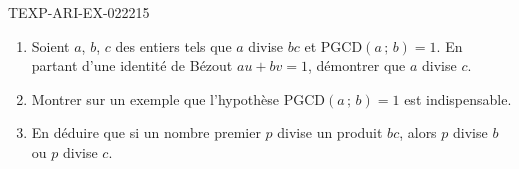 \begin{exercice}{TEXP-ARI-EX-022}{2}{15}
\begin{enumerate}
  \item Soient $a$, $b$, $c$ des entiers tels que $a$ divise $bc$ et
        $\mathrm{PGCD}(a\,;\,b)=1$. En partant d'une identité de Bézout
        $au+bv=1$, démontrer que $a$ divise $c$.
  \item Montrer sur un exemple que l'hypothèse $\mathrm{PGCD}(a\,;\,b)=1$ est
        indispensable.
  \item En déduire que si un nombre premier $p$ divise un produit $bc$, alors
        $p$ divise $b$ ou $p$ divise $c$.
\end{enumerate}
\end{exercice}
